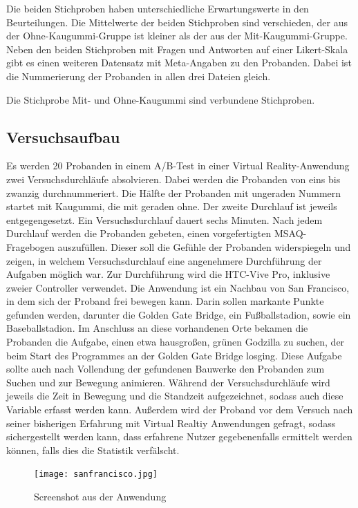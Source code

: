 \documentclass[conference]{IEEEtran}
\begin{document}
Die beiden Stichproben haben unterschiedliche Erwartungswerte in den Beurteilungen. Die Mittelwerte der beiden Stichproben sind verschieden, der aus der Ohne-Kaugummi-Gruppe ist kleiner als der aus der Mit-Kaugummi-Gruppe. Neben den beiden Stichproben mit Fragen und Antworten auf einer Likert-Skala gibt es einen weiteren Datensatz mit Meta-Angaben zu den Probanden. Dabei ist die Nummerierung der Probanden in allen drei Dateien gleich.

Die Stichprobe Mit- und Ohne-Kaugummi sind verbundene Stichproben.

\subsection{Versuchsaufbau}
Es werden 20 Probanden in einem A/B-Test in einer Virtual Reality-Anwendung zwei Versuchsdurchläufe absolvieren. Dabei werden die Probanden von eins bis zwanzig durchnummeriert. Die Hälfte der Probanden mit ungeraden Nummern startet mit Kaugummi, die mit geraden ohne. Der zweite Durchlauf ist jeweils entgegengesetzt. Ein Versuchsdurchlauf dauert sechs Minuten. Nach jedem Durchlauf werden die Probanden gebeten, einen vorgefertigten MSAQ-Fragebogen auszufüllen. Dieser soll die Gefühle der Probanden widerspiegeln und zeigen, in welchem Versuchsdurchlauf eine angenehmere Durchführung der Aufgaben möglich war. Zur Durchführung wird die HTC-Vive Pro, inklusive zweier Controller verwendet. Die Anwendung ist ein Nachbau von San Francisco, in dem sich der Proband frei bewegen kann. Darin sollen markante Punkte gefunden werden, darunter die Golden Gate Bridge, ein Fußballstadion, sowie ein Baseballstadion. Im Anschluss an diese vorhandenen Orte bekamen die Probanden die Aufgabe, einen etwa hausgroßen, grünen Godzilla zu suchen, der beim Start des Programmes an der Golden Gate Bridge losging. Diese Aufgabe sollte auch nach Vollendung der gefundenen Bauwerke den Probanden zum Suchen und zur Bewegung animieren. Während der Versuchsdurchläufe wird jeweils die Zeit in Bewegung und die Standzeit aufgezeichnet, sodass auch diese Variable erfasst werden kann. Außerdem wird der Proband vor dem Versuch nach seiner bisherigen Erfahrung mit Virtual Realtiy Anwendungen gefragt, sodass sichergestellt werden kann, dass erfahrene Nutzer gegebenenfalls ermittelt werden können, falls dies die Statistik verfälscht. 
\\
\begin{figure}
	\centering
	\texttt{[image: sanfrancisco.jpg]}
	\caption{Screenshot aus der Anwendung}
	\label{img:screenshot}
\end{figure}
\end{document}
